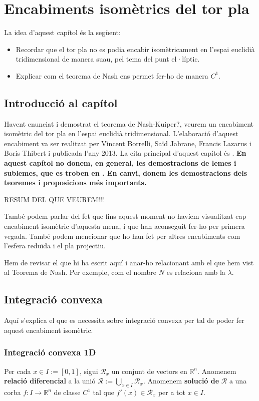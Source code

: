 \chapter{Encabiments isomètrics del tor pla}
{\color{blue}La idea d'aquest capítol és la següent:
\begin{itemize}
    \item Recordar que el tor pla no es podia encabir isomètricament en l'espai euclidià tridimensional de manera suau, pel tema del punt el·líptic.
    \item Explicar com el teorema de Nash ens permet fer-ho de manera $C^1$.
\end{itemize}
}
\section{Introducció al capítol}
Havent enunciat i demostrat el teorema de Nash{\color{blue}-Kuiper?}, veurem un encabiment isomètric del tor pla en l'espai euclidià tridimensional. L'elaboració d'aquest encabiment va ser realitzat per Vincent Borrelli, Saïd Jabrane, Francis Lazarus i Boris Thibert i publicada l'any 2013. La cita principal d'aquest capítol és \cite{borrelli2013}. \textbf{En aquest capítol no donem, en general, les demostracions de lemes i sublemes, que es troben en \cite{borrelli2013}. En canvi, donem les demostracions dels teoremes i proposicions més importants.}

{\color{blue} RESUM DEL QUE VEUREM!!!

També podem parlar del fet que fins aquest moment no havíem visualitzat cap encabiment isomètric d'aquesta mena, i que han aconseguit fer-ho per primera vegada. També podem mencionar que ho han fet per altres encabiments com l'esfera reduïda i el pla projectiu.

Hem de revisar el que hi ha escrit aquí i anar-ho relacionant amb el que hem vist al Teorema de Nash. Per exemple, com el nombre $N$ es relaciona amb la $\lambda$.}

\section{Integració convexa}
{\color{blue}Aquí s'explica el que es necessita sobre integració convexa per tal de poder fer aquest encabiment isomètric.}
\subsection{Integració convexa 1D}
\begin{defi}
    Per cada $x\in I := [0,1]$, sigui $\mathcal R_x$ un conjunt de vectors en $\mathbb R^n$. Anomenem \textbf{relació diferencial} a la unió $\mathcal R := \bigcup_{x\in I} \mathcal R_x$. Anomenem \textbf{solució de} $\mathcal R$ a una corba $f:I\to\mathbb R^n$ de classe $C^1$ tal que $f'(x)\in\mathcal R_x$ per a tot $x\in I$.
\end{defi}


